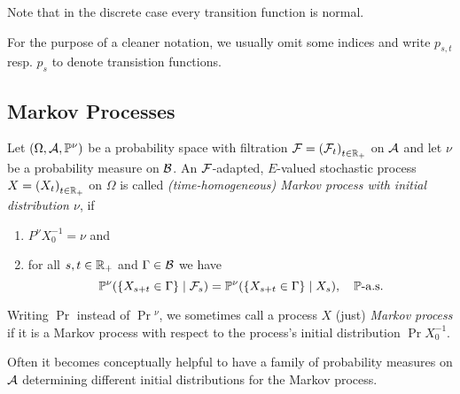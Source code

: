 \documentclass[../Master.tex]{subfiles}
\begin{document}
Note that in the discrete case every transition function is normal.

For the purpose of a cleaner notation, we usually omit some indices and write \(p_{s,t}\) resp. \(p_s\) to denote transistion functions.

\subsection{Markov Processes}


\begin{definition}
  Let \((\Omega, \mathcal{A}, \mathbb{P}^\nu)\) be a probability space with filtration \(\mathcal{F} = {(\mathcal{F}_t)}_{t \in \mathbb{R}_+}\) on \(\mathcal{A} \) and let \(\nu{}\) be a probability measure on \(\mathcal{B}\). An \(\mathcal{F}\)-adapted, \(E\)-valued stochastic process \(X = {(X_t)}_{t \in \mathbb{R}_+}\) on \(\Omega{}\) is called \textit{(time-homogeneous) Markov process with initial distribution \(\nu{}\)}, if
  \begin{enumerate}[label = (\roman*)]
    \item \(P^\nu X_0^{-1} = \nu{}\) and
    \item\label{item:Markov_condition} for all \(s,t \in \mathbb{R}_+\) and \(\Gamma \in \mathcal{B}\) we have
    \begin{equation}\label{Markov_condition}
      \mathbb{P}^\nu(\{X_{s + t} \in \Gamma \} \mid \mathcal{F}_s) = \mathbb{P}^\nu(\{X_{s + t} \in \Gamma \} \mid X_s), \quad \mathbb{P} \text{-a.s.}
    \end{equation}
  \end{enumerate}
\end{definition}

Writing \(\Pr{}\) instead of \(\Pr{}^\nu{}\), we sometimes call a process \(X\) (just) \emph{Markov process} if it is a Markov process with respect to the process's initial distribution \(\Pr X_0^{-1}\).

Often it becomes conceptually helpful to have a family of probability measures on \(\mathcal{A}\) determining different initial distributions for the Markov process.
\end{document}
